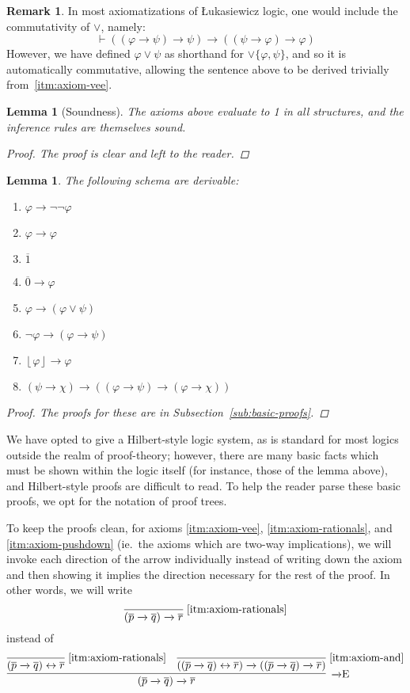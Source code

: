 \documentclass{amsart}
\newtheorem{lemma}[theorem]{Lemma}
\theoremstyle{definition}
\newtheorem{remark}[theorem]{Remark}
\numberwithin{equation}{theorem}
\renewcommand{\phi}{\varphi}
\newcommand{\unvee}{{\vee}}
\newcommand{\proves}{\vdash}
\newcommand{\strict}[1]{{\left\lfloor#1\right\rfloor}}
\newcommand{\rat}[1]{{\overline{#1}}}
\newcommand{\narrow}[1]{\xrightarrow{#1}}
\renewcommand{\to}{\narrow{}}
\newcommand{\arr}{{\to}}
\newcommand{\elim}{\!\operatorname{E}}
\newcommand{\aref}[1]{\!\text{\ref{itm:axiom-#1}}}
\begin{document}
\begin{remark}
  In most axiomatizations of {\L}ukasiewicz logic, one would include the commutativity of $\vee$, namely:
  \[
    \proves ((\phi\to\psi)\to\psi)\to((\psi\to\phi)\to\phi)
  \]
  However, we have defined $\phi\vee\psi$ as shorthand for $\unvee\{\phi,\psi\}$, and so it is automatically commutative, allowing the sentence above to be derived trivially from~\ref{itm:axiom-vee}.
\end{remark}
\begin{lemma}[Soundness]
  The axioms above evaluate to 1 in all structures, and the inference rules are themselves sound.
  \begin{proof}
    The proof is clear and left to the reader.
  \end{proof}
\end{lemma}
\begin{lemma}\label{lem:near-axioms}
  The following schema are derivable:
  \begin{enumerate}[label=(PL\arabic*), font=\normalfont]
  \item\label{itm:axiom-rev-classic} $\phi\to\neg\neg\phi$
  \item\label{itm:axiom-id-arrow} $\phi\to\phi$
  \item\label{itm:axiom-1} $\rat1$
  \item\label{itm:axiom-0-arrow} $\rat0\to\phi$
  \item\label{itm:axiom-vee-arrow} $\phi\to(\phi\vee\psi)$
  \item\label{itm:axiom-arrow-explode} $\neg\phi\to(\phi\to\psi)$
  \item\label{itm:axiom-strict-arrow} $\strict\phi\to\phi$
  \item\label{itm:axiom-rev-trans} $(\psi\to\chi)\to((\phi\to\psi)\to(\phi\to\chi))$
  \end{enumerate}
  \begin{proof}
    The proofs for these are in Subsection~\ref{sub:basic-proofs}.
  \end{proof}
\end{lemma}
We have opted to give a Hilbert-style logic system, as is standard for most logics outside the realm of proof-theory;
however, there are many basic facts which must be shown within the logic itself (for instance, those of the lemma above), and Hilbert-style proofs are difficult to read.
To help the reader parse these basic proofs, we opt for the notation of proof trees.

To keep the proofs clean, for axioms \ref{itm:axiom-vee}, \ref{itm:axiom-rationals}, and \ref{itm:axiom-pushdown} (ie.\ the axioms which are two-way implications), we will invoke each direction of the arrow individually instead of writing down the axiom and then showing it implies the direction necessary for the rest of the proof.
In other words, we will write
\[
  \infer[\aref{rationals}]{(\rat p\to\rat q)\to\rat r}{}
\]
instead of
\[
  \infer[\arr\elim]{(\rat p\to\rat q)\to\rat r}{
    \infer[\aref{rationals}]{(\rat p\to\rat q)\leftrightarrow\rat r}{} &
    \infer[\aref{and}]{((\rat p\to\rat q)\leftrightarrow\rat r)\to((\rat p\to\rat q)\to\rat r)}{}
  }
\]
\end{document}
